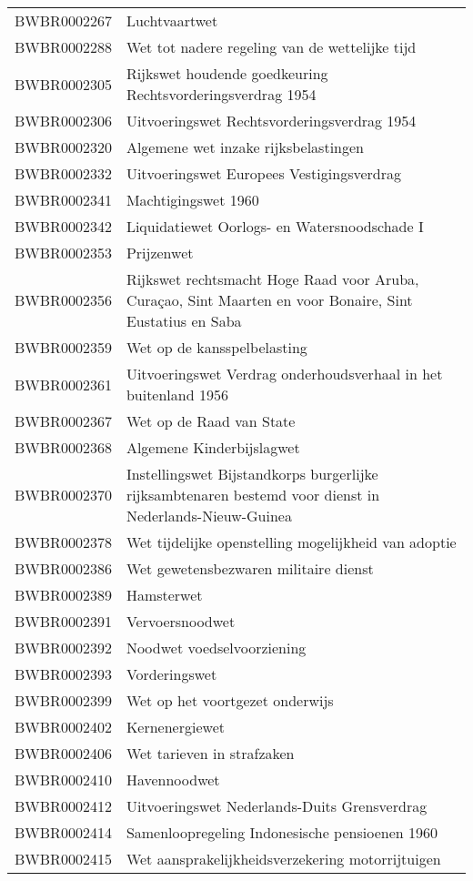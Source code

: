 \begin{longtable}{lp{}}
BWBR0002267 & Luchtvaartwet \\
BWBR0002288 & Wet tot nadere regeling van de wettelijke tijd \\
BWBR0002305 & Rijkswet houdende goedkeuring Rechtsvorderingsverdrag 1954 \\
BWBR0002306 & Uitvoeringswet Rechtsvorderingsverdrag 1954 \\
BWBR0002320 & Algemene wet inzake rijksbelastingen \\
BWBR0002332 & Uitvoeringswet Europees Vestigingsverdrag \\
BWBR0002341 & Machtigingswet 1960 \\
BWBR0002342 & Liquidatiewet Oorlogs- en Watersnoodschade I \\
BWBR0002353 & Prijzenwet \\
BWBR0002356 & Rijkswet rechtsmacht Hoge Raad voor Aruba, Curaçao, Sint Maarten en voor Bonaire, Sint Eustatius en Saba \\
BWBR0002359 & Wet op de kansspelbelasting \\
BWBR0002361 & Uitvoeringswet Verdrag onderhoudsverhaal in het buitenland 1956 \\
BWBR0002367 & Wet op de Raad van State \\
BWBR0002368 & Algemene Kinderbijslagwet \\
BWBR0002370 & Instellingswet Bijstandkorps burgerlijke rijksambtenaren bestemd voor dienst in Nederlands-Nieuw-Guinea  \\
BWBR0002378 & Wet tijdelijke openstelling mogelijkheid van adoptie \\
BWBR0002386 & Wet gewetensbezwaren militaire dienst \\
BWBR0002389 & Hamsterwet \\
BWBR0002391 & Vervoersnoodwet  \\
BWBR0002392 & Noodwet voedselvoorziening \\
BWBR0002393 & Vorderingswet  \\
BWBR0002399 & Wet op het voortgezet onderwijs \\
BWBR0002402 & Kernenergiewet \\
BWBR0002406 & Wet tarieven in strafzaken \\
BWBR0002410 & Havennoodwet \\
BWBR0002412 & Uitvoeringswet Nederlands-Duits Grensverdrag \\
BWBR0002414 & Samenloopregeling Indonesische pensioenen 1960 \\
BWBR0002415 & Wet aansprakelijkheidsverzekering motorrijtuigen \\

\end{longtable}
